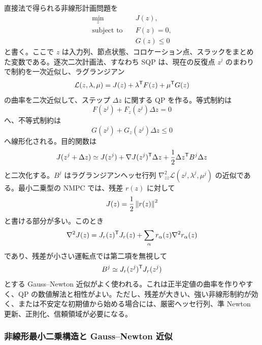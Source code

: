 直接法で得られる非線形計画問題を
\begin{align}
  \min_z\quad &J(z),\\
  \text{subject to}\quad &F(z)=0,\\
  &G(z)\le0
\end{align}
と書く。ここで $z$ は入力列、節点状態、コロケーション点、スラックをまとめた変数である。逐次二次計画法、すなわち SQP は、現在の反復点 $z^j$ のまわりで制約を一次近似し、ラグランジアン
\begin{equation}
  \mathcal{L}(z,\lambda,\mu)
  =J(z)+\lambda^{\mathsf{T}} F(z)+\mu^{\mathsf{T}} G(z)
\end{equation}
の曲率を二次近似して、ステップ $\Delta z$ に関する QP を作る。等式制約は
\begin{equation}
  F(z^j)+F_z(z^j)\Delta z=0
\end{equation}
へ、不等式制約は
\begin{equation}
  G(z^j)+G_z(z^j)\Delta z\le0
\end{equation}
へ線形化される。目的関数は
\begin{equation}
  J(z^j+\Delta z)
  \simeq
  J(z^j)+\nabla J(z^j)^{\mathsf{T}}\Delta z
  +\frac{1}{2}\Delta z^{\mathsf{T}} B^j\Delta z
\end{equation}
と二次化する。$B^j$ はラグランジアンヘッセ行列 $\nabla_{zz}^{2}\mathcal{L}(z^j,\lambda^j,\mu^j)$ の近似である。最小二乗型の NMPC では、残差 $r(z)$ に対して
\begin{equation}
  J(z)=\frac{1}{2}\left\|r(z)\right\|^2
\end{equation}
と書ける部分が多い。このとき
\begin{equation}
  \nabla^2 J(z)
  =J_r(z)^{\mathsf{T}} J_r(z)
  +\sum_\alpha r_\alpha(z)\nabla^2 r_\alpha(z)
\end{equation}
であり、残差が小さい運転点では第二項を無視して
\begin{equation}
  B^j\simeq J_r(z^j)^{\mathsf{T}} J_r(z^j)
\end{equation}
とする Gauss--Newton 近似がよく使われる。これは正半定値の曲率を作りやすく、QP の数値解法と相性がよい。ただし、残差が大きい、強い非線形制約が効く、または不安定な初期値から始める場合には、厳密ヘッセ行列、準 Newton 更新、正則化、信頼領域が必要になる。

\subsubsection{非線形最小二乗構造と Gauss--Newton 近似}

